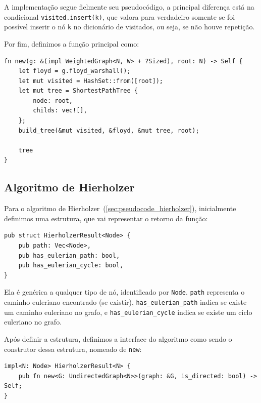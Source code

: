 A implementação segue fielmente seu pseudocódigo, a principal
diferença está na condicional \texttt{visited.insert(k)}, que valora
para verdadeiro somente se foi possível inserir o nó \texttt{k} no
dicionário de visitados, ou seja, se não houve repetição.

Por fim, definimos a função principal como:

\begin{listing}[H]
  \caption{Implementação do algoritmo da criação da árvore de menores caminhos}
  \begin{verbatim}
fn new(g: &(impl WeightedGraph<N, W> + ?Sized), root: N) -> Self {
    let floyd = g.floyd_warshall();
    let mut visited = HashSet::from([root]);
    let mut tree = ShortestPathTree {
        node: root,
        childs: vec![],
    };
    build_tree(&mut visited, &floyd, &mut tree, root);

    tree
}
  \end{verbatim}
\end{listing}

\subsection{Algoritmo de Hierholzer}

Para o algoritmo de Hierholzer~(\ref{sec:pseudocode_hierholzer}), inicialmente definimos uma
estrutura, que vai representar o retorno da função:

\begin{listing}[H]
  \caption{Estrutura de resultado do Algoritmo de Hierholzer}
\begin{verbatim}
pub struct HierholzerResult<Node> {
    pub path: Vec<Node>,
    pub has_eulerian_path: bool,
    pub has_eulerian_cycle: bool,
}
\end{verbatim}
\end{listing}

Ela é genérica a qualquer tipo de nó, identificado por \texttt{Node}. 
\texttt{path} representa o caminho euleriano encontrado (se existir), 
\texttt{has\_eulerian\_path} indica se existe um caminho euleriano no grafo,
e \texttt{has\_eulerian\_cycle} indica se existe um ciclo euleriano no grafo.

Após definir a estrutura, definimos a interface do algoritmo como sendo o
construtor dessa estrutura, nomeado de \texttt{new}:
\begin{listing}[H]
  \caption{Interface do algoritmo de Hierholzer}
\begin{verbatim}
impl<N: Node> HierholzerResult<N> {
    pub fn new<G: UndirectedGraph<N>>(graph: &G, is_directed: bool) -> Self;
}
\end{verbatim}
\end{listing}

